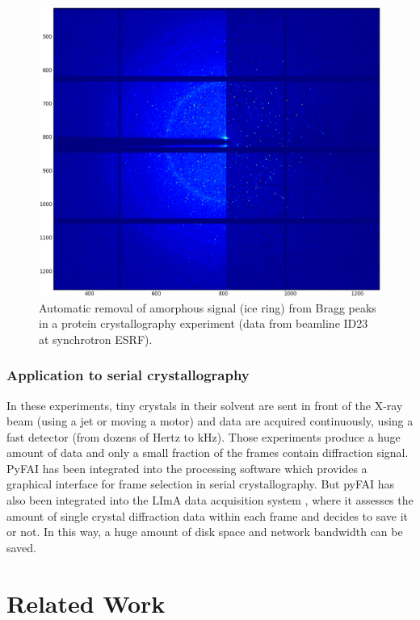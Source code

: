 \documentclass[preprint]{iucr}
\begin{document}
\begin{figure}
\label{separate}
\begin{center}
\includegraphics[width=15cm]{separate_id23.eps}
\caption{Automatic removal of amorphous signal (ice ring) from Bragg peaks in a
protein crystallography experiment (data from beamline ID23 at synchrotron
ESRF).}
\end{center}
\end{figure}

\subsubsection{Application to serial crystallography}
In these experiments, tiny crystals in their solvent are sent in
front of the X-ray beam (using a jet or moving a motor) and data are acquired
continuously, using a fast detector (from dozens of Hertz to kHz).
Those experiments produce a huge amount of data and only a small fraction of the
frames contain diffraction signal.
PyFAI has been integrated into the processing software 
which provides a graphical interface for frame selection in serial crystallography.
But pyFAI has also been integrated into the LImA data acquisition system
\cite{lima}, where it assesses the amount of single crystal
diffraction data within each frame and decides to save it or not.
In this way, a huge amount of disk space and network bandwidth
can be saved.

\section{Related Work}
\end{document}

